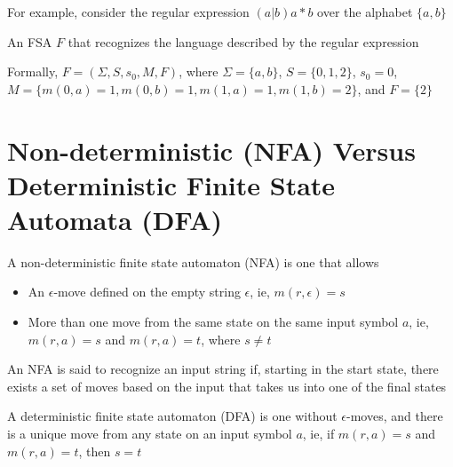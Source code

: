 \documentclass[8pt,a4paper,compress]{beamer}
\begin{document}
\begin{frame}[fragile]
\pause

For example, consider the regular expression $(a|b)a\!*\!b$ over the alphabet $\{a, b\}$

\pause\bigskip

An FSA $F$ that recognizes the language described by the regular expression

\begin{center}
\end{center}

\pause\bigskip
Formally, $F = (\Sigma, S, s_0, M, F)$, where $\Sigma = \{a, b\}$, $S = \{0, 1, 2\}$, $s_0 = 0$, $M = \{m(0, a) = 1, m(0, b) = 1, m(1, a) = 1, m(1, b) = 2\}$, and $F = \{2\}$
\end{frame}

\section{Non-deterministic (NFA) Versus Deterministic Finite State Automata (DFA)}
\begin{frame}[fragile]
\pause

A non-deterministic finite state automaton (NFA) is one that allows
\begin{itemize}
\pause
\item An $\epsilon$-move defined on the empty string $\epsilon$, ie, $m(r, \epsilon) = s$

\pause
\item More than one move from the same state on the same input symbol $a$, ie, $m(r, a) = s$ and $m(r, a) = t$, \noindent where $s \neq t$
\end{itemize}

\pause\bigskip

An NFA is said to recognize an input string if, starting in the start state, there exists a set of moves based on the input that takes us into one of the final states

\pause\bigskip

A deterministic finite state automaton (DFA) is one without $\epsilon$-moves, and there is a unique move from any state on an input symbol $a$, ie, if $m(r, a) = s$ and $m(r, a) = t$, then $s = t$
\end{frame}
\end{document}
